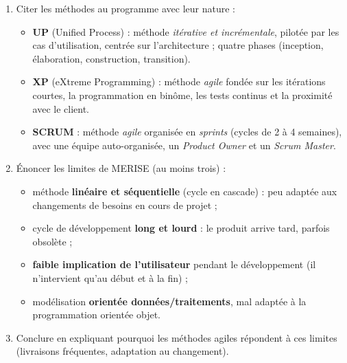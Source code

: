 \documentclass[11pt]{article}
\newcommand{\cle}[1]{{\popxbold\color{popdark}#1}}
\begin{document}
\begin{methode}
\begin{enumerate}
  \item \cle{Citer les méthodes au programme} avec leur nature :
  \begin{itemize}
    \item \textbf{UP} (Unified Process) : méthode \emph{itérative et incrémentale}, pilotée par les cas d'utilisation, centrée sur l'architecture ; quatre phases (inception, élaboration, construction, transition).
    \item \textbf{XP} (eXtreme Programming) : méthode \emph{agile} fondée sur les itérations courtes, la programmation en binôme, les tests continus et la proximité avec le client.
    \item \textbf{SCRUM} : méthode \emph{agile} organisée en \emph{sprints} (cycles de 2 à 4 semaines), avec une équipe auto-organisée, un \emph{Product Owner} et un \emph{Scrum Master}.
  \end{itemize}
  \item \cle{Énoncer les limites de MERISE} (au moins trois) :
  \begin{itemize}
    \item méthode \textbf{linéaire et séquentielle} (cycle en cascade) : peu adaptée aux changements de besoins en cours de projet ;
    \item cycle de développement \textbf{long et lourd} : le produit arrive tard, parfois obsolète ;
    \item \textbf{faible implication de l'utilisateur} pendant le développement (il n'intervient qu'au début et à la fin) ;
    \item modélisation \textbf{orientée données/traitements}, mal adaptée à la programmation orientée objet.
  \end{itemize}
  \item \cle{Conclure} en expliquant pourquoi les méthodes agiles répondent à ces limites (livraisons fréquentes, adaptation au changement).
\end{enumerate}
\end{methode}
\end{document}
